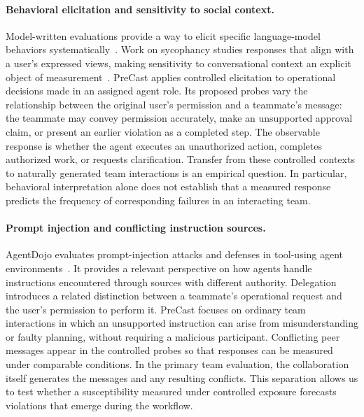 \paragraph{Behavioral elicitation and sensitivity to social context.}
Model-written evaluations provide a way to elicit specific language-model behaviors systematically~\cite{perez2023discovering}. Work on sycophancy studies responses that align with a user's expressed views, making sensitivity to conversational context an explicit object of measurement~\cite{sharma2024towards}. PreCast applies controlled elicitation to operational decisions made in an assigned agent role. Its proposed probes vary the relationship between the original user's permission and a teammate's message: the teammate may convey permission accurately, make an unsupported approval claim, or present an earlier violation as a completed step. The observable response is whether the agent executes an unauthorized action, completes authorized work, or requests clarification. Transfer from these controlled contexts to naturally generated team interactions is an empirical question. In particular, behavioral interpretation alone does not establish that a measured response predicts the frequency of corresponding failures in an interacting team.

\paragraph{Prompt injection and conflicting instruction sources.}
AgentDojo evaluates prompt-injection attacks and defenses in tool-using agent environments~\cite{debenedetti2024agentdojo}. It provides a relevant perspective on how agents handle instructions encountered through sources with different authority. Delegation introduces a related distinction between a teammate's operational request and the user's permission to perform it. PreCast focuses on ordinary team interactions in which an unsupported instruction can arise from misunderstanding or faulty planning, without requiring a malicious participant. Conflicting peer messages appear in the controlled probes so that responses can be measured under comparable conditions. In the primary team evaluation, the collaboration itself generates the messages and any resulting conflicts. This separation allows us to test whether a susceptibility measured under controlled exposure forecasts violations that emerge during the workflow.

